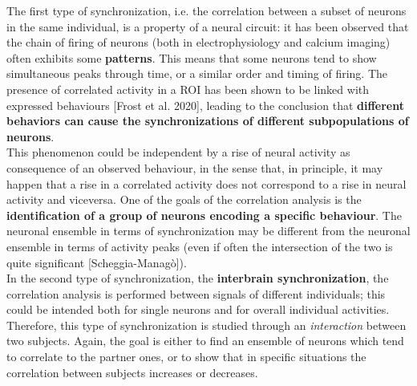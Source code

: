 \documentclass[12pt, a4paper]{article}
\begin{document}
The first type of synchronization, i.e. the correlation between a subset of neurons in the same individual, is a property of a neural circuit: it has been observed that the chain of firing of neurons (both in electrophysiology and calcium imaging) often exhibits some \textbf{patterns}. This means that some neurons tend to show simultaneous peaks through time, or a similar order and timing of firing. The presence of correlated activity in a ROI has been shown to be linked with expressed behaviours [Frost et al. 2020], leading to the conclusion that \textbf{different behaviors can cause the synchronizations of different  subpopulations of neurons}.\\
This phenomenon could be independent by a rise of neural activity as consequence of an observed behaviour, in the sense that, in principle, it may happen that a rise in a correlated activity does not correspond to a rise in neural activity and viceversa. One of the goals of the correlation analysis is the \textbf{identification of a group of neurons encoding a specific behaviour}. The neuronal ensemble in terms of synchronization may be different from the neuronal ensemble in terms of activity peaks (even if often the intersection of the two is quite significant [Scheggia-Managò]).\\
In the second type of synchronization, the \textbf{interbrain synchronization}, the correlation analysis is performed between signals of different individuals; this could be intended both for single neurons and for  overall individual activities. Therefore, this type of synchronization is studied through an \textit{interaction} between two subjects. Again, the goal is either to find an ensemble of neurons which tend to correlate to the partner ones, or to show that in specific situations the correlation between subjects increases or decreases.\\
\end{document}
